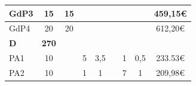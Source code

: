 \documentclass[a4paper]{article}
\begin{document}
\begin{table}[H]
\begin{center}
\begin{tabular}{|l|c|c|c|c|c|c|c|c|}
            {\color[HTML]{000000} GdP3}                                                            & {\color[HTML]{000000} 15}                                                               & {\color[HTML]{000000} 15}                 & {\color[HTML]{000000} }                 & {\color[HTML]{000000} }              & {\color[HTML]{000000} }                 & {\color[HTML]{000000} }                   & {\color[HTML]{000000} }                 & {\color[HTML]{000000} 459,15€}             \\ \hline
            {\color[HTML]{000000} GdP4}                                                            & {\color[HTML]{000000} 20}                                                               & {\color[HTML]{000000} 20}                 & {\color[HTML]{000000} }                 & {\color[HTML]{000000} }              & {\color[HTML]{000000} }                 & {\color[HTML]{000000} }                   & {\color[HTML]{000000} }                 & {\color[HTML]{000000} 612,20€}             \\ \hline
            \rowcolor[HTML]{C0C0C0} 
            {\color[HTML]{000000} \textbf{D}}                                                      & {\color[HTML]{000000} \textbf{270}}                                                     & {\color[HTML]{000000} \textbf{}}          & {\color[HTML]{000000} \textbf{}}        & {\color[HTML]{000000} \textbf{}}     & {\color[HTML]{000000} \textbf{}}        & {\color[HTML]{000000} \textbf{}}          & {\color[HTML]{000000} \textbf{}}        & {\color[HTML]{000000} \textbf{}}           \\ \hline
            {\color[HTML]{000000} PA1}                                                             & {\color[HTML]{000000} 10}                                                               & {\color[HTML]{000000} }                   & {\color[HTML]{000000} 5}                & {\color[HTML]{000000} 3,5}           & {\color[HTML]{000000} }                 & {\color[HTML]{000000} 1}                  & {\color[HTML]{000000} 0,5}              & {\color[HTML]{000000} 233.53€}             \\ \hline
            {\color[HTML]{000000} PA2}                                                             & {\color[HTML]{000000} 10}                                                               & {\color[HTML]{000000} }                   & {\color[HTML]{000000} 1}                & {\color[HTML]{000000} 1}             & {\color[HTML]{000000} }                 & {\color[HTML]{000000} 7}                  & {\color[HTML]{000000} 1}                & {\color[HTML]{000000} 209,98€}             \\ \hline

\end{tabular}
\end{center}
\end{table}
\end{document}
